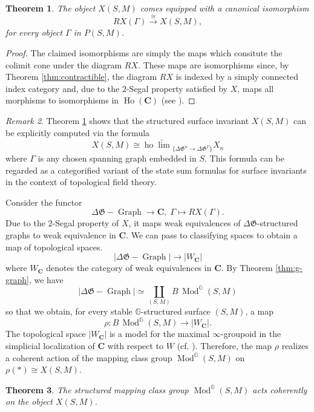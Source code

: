 \documentclass[english,11pt,leqno]{article}
\def\GG{\mathbb{G}}
\def\Gen{\mathfrak{G}}
\def\Cb{\mathbf{C}}
\def\Ho{\operatorname{Ho}}
\def\Mod{\operatorname{Mod}}
\def\on{\operatorname}
\def\lra{\longrightarrow}
\def\hopro{\operatorname{ho}\!\varprojlim{}}
\def\ho{\operatorname{ho}\!}
\def\hopro{\ho \underleftarrow{\lim}{}}
\def\DGgraph{\DG-\on{Graph}}
\def\DG{ {\Delta \Gen}}
\newtheorem{thm}{Theorem}[section]
\theoremstyle{definition}
\theoremstyle{remark}
\newtheorem{rem}[thm]{Remark}
\numberwithin{equation}{section}
\begin{document}
\begin{thm}\label{thm:state-sum} The object $X(S,M)$ comes equipped with a canonical isomorphism
	\begin{equation}\label{eq:statesum}
			RX({\Gamma}) \overset{\cong}{\lra} X(S,M), 
	\end{equation}
	for every object $\Gamma$ in $P(S,M)$.
\end{thm}
\begin{proof}
	The claimed isomorphisms are simply the maps which consitute the colimit cone under the
	diagram $RX$. These maps are isomorphisms since, by Theorem \ref{thm:contractible}, the
	diagram $RX$ is indexed by a simply connected index category and, due to the $2$-Segal
	property satisfied by $X$, maps all morphisms to isomorphisms in $\Ho(\Cb)$ (see
	\cite{HSS-triangulated}).
\end{proof}

\begin{rem} Theorem \ref{thm:state-sum} shows that the structured surface invariant $X(S,M)$ can be explicitly 
	computed via the formula 
	\[
		X(S,M) \cong \hopro_{\{\DG^n \to \DG^{\Gamma}\}} X_n
	\]
	where $\Gamma$ is any chosen spanning graph embedded in $S$. This formula can be regarded as
	a categorified variant of the state sum formulas for surface invariants in the context of
	topological field theory.
\end{rem}

Consider the functor
\[
  \DGgraph \lra \Cb, \; \Gamma \mapsto RX(\Gamma).
\]
Due to the $2$-Segal property of $X$, it maps weak equivalences of $\DG$-structured graphs to weak
equivalence in $\Cb$. We can pass to classifying spaces to obtain a map of topological spaces.
\[
  |\DGgraph| \lra |W_{\Cb}|
\]
where $W_{\Cb}$ denotes the category of weak equivalences in $\Cb$. By Theorem \ref{thm:g-graph}, we
have
\[
	|\DGgraph| \simeq \coprod_{(S,M)} B\, \Mod^\GG(S,M)
\]
so that we obtain, for every stable $\GG$-structured surface $(S,M)$, a map
\[
	\rho: B\, \Mod^\GG(S,M) \lra |W_{\Cb}|.
\]
The topological space $|W_{\Cb}|$ is a model for the maximal $\infty$-groupoid in the simplicial
localization of $\Cb$ with respect to $W$ (cf. \cite{dwyer-kan}). Therefore, the map $\rho$ realizes
a coherent action of the mapping class group $\Mod^\GG(S,M)$ on $\rho(*) \cong X(S,M)$. 

\begin{thm}\label{thm:mod-act} The structured mapping class group $\Mod^\GG(S,M)$ acts coherently on
  the object $X(S,M)$.
\end{thm}
\end{document}
